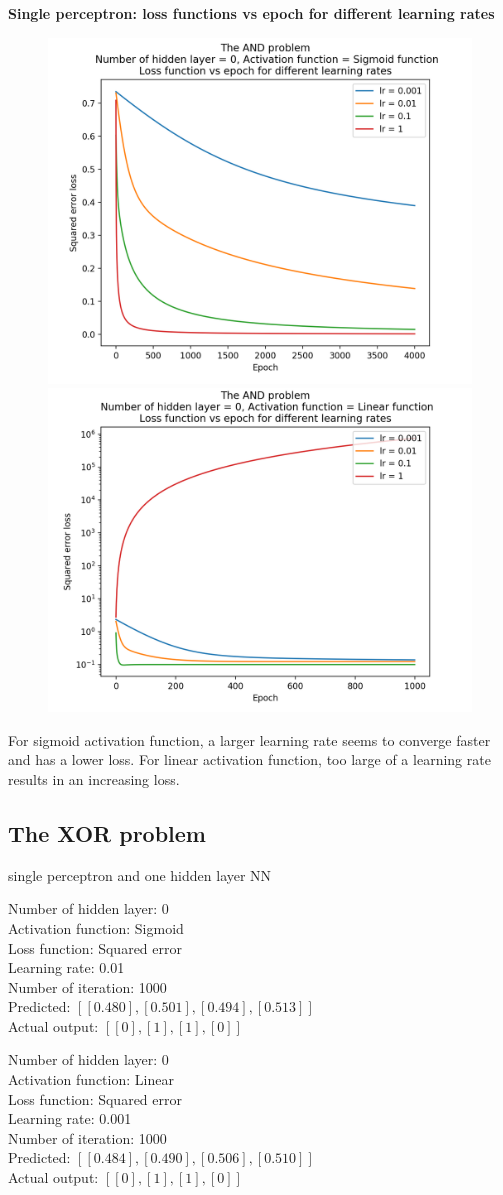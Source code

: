 \documentclass[12pt]{amsart}
\begin{document}
\vfill
\pagebreak
\textbf{Single perceptron: loss functions vs epoch for different learning rates}

\begin{figure}[h]
\includegraphics[width=0.49\columnwidth]{and_sigmoid_mse_lrs.png}
\includegraphics[width=0.49\columnwidth]{and_linear_mse_lrs.png}
\end{figure}

For sigmoid activation function, a larger learning rate seems to converge faster and has a lower loss. For linear activation function, too large of a learning rate results in an increasing loss. \\

\subsection{The XOR problem} single perceptron and one hidden layer NN \\
\begin{multicols}{2}
Number of hidden layer: 0 \\
Activation function: Sigmoid \\
Loss function: Squared error\\
Learning rate: 0.01\\
Number of iteration: 1000 \\
Predicted: $[[0.480], [0.501], [0.494], [0.513]]$ \\
Actual output: $[[0],[1],[1],[0]]$

Number of hidden layer: 0 \\
Activation function: Linear \\
Loss function: Squared error\\
Learning rate: 0.001 \\
Number of iteration: 1000 \\
Predicted: $[[0.484], [0.490], [0.506], [0.510]]$ \\
Actual output: $[[0],[1],[1],[0]]$
\end{multicols}
\end{document}
